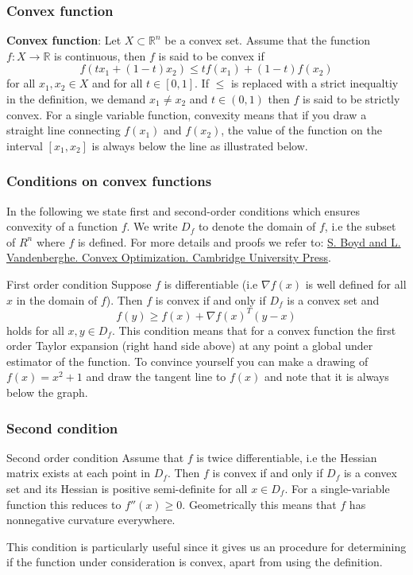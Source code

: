 \documentclass{beamer}
\begin{document}
\begin{frame}
\frametitle{Convex function}

\textbf{Convex function}: Let $X \subset \mathbb{R}^n$ be a convex set. Assume that the function $f: X \rightarrow \mathbb{R}$ is continuous, then $f$ is said to be convex if $$f(tx_1 + (1-t)x_2) \leq tf(x_1) + (1-t)f(x_2) $$ for all $x_1, x_2 \in X$ and for all $t \in [0,1]$. If $\leq$ is replaced with a strict inequaltiy in the definition, we demand $x_1 \neq x_2$ and $t\in(0,1)$ then $f$ is said to be strictly convex. For a single variable function, convexity means that if you draw a straight line connecting $f(x_1)$ and $f(x_2)$, the value of the function on the interval $[x_1,x_2]$ is always below the line as illustrated below.
\end{frame}

\begin{frame}
\frametitle{Conditions on convex functions}

In the following we state first and second-order conditions which
ensures convexity of a function $f$. We write $D_f$ to denote the
domain of $f$, i.e the subset of $R^n$ where $f$ is defined. For more
details and proofs we refer to: \href{{http://stanford.edu/boyd/cvxbook/, 2004}}{S. Boyd and L. Vandenberghe. Convex Optimization. Cambridge University Press}.

\begin{block}{First order condition }
Suppose $f$ is differentiable (i.e $\nabla f(x)$ is well defined for
all $x$ in the domain of $f$). Then $f$ is convex if and only if $D_f$
is a convex set and $$f(y) \geq f(x) + \nabla f(x)^T (y-x) $$ holds
for all $x,y \in D_f$. This condition means that for a convex function
the first order Taylor expansion (right hand side above) at any point
a global under estimator of the function. To convince yourself you can
make a drawing of $f(x) = x^2+1$ and draw the tangent line to $f(x)$ and
note that it is always below the graph.  
\end{block}
\end{frame}

\begin{frame}
\frametitle{Second condition}

\begin{block}{Second order condition  }
Assume that $f$ is twice
differentiable, i.e the Hessian matrix exists at each point in
$D_f$. Then $f$ is convex if and only if $D_f$ is a convex set and its
Hessian is positive semi-definite for all $x\in D_f$. For a
single-variable function this reduces to $f''(x) \geq 0$. Geometrically this means that $f$ has nonnegative curvature
everywhere.
\end{block}

This condition is particularly useful since it gives us an procedure for determining if the function under consideration is convex, apart from using the definition.
\end{frame}
\end{document}
